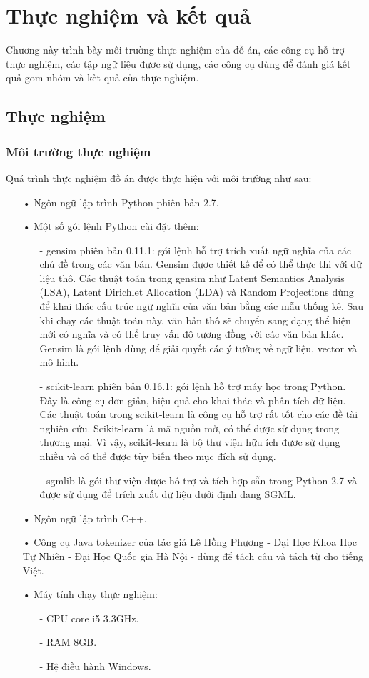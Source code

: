 \chapter{Thực nghiệm và kết quả}
\label{Chapter4}
Chương này trình bày môi trường thực nghiệm của đồ án, các công cụ hỗ trợ thực nghiệm, các tập ngữ liệu được sử dụng, các công cụ dùng để đánh giá kết quả gom nhóm và kết quả của thực nghiệm.

\section{Thực nghiệm}
\subsection{Môi trường thực nghiệm}
Quá trình thực nghiệm đồ án được thực hiện với môi trường như sau:
\begin{enumerate}
\item[•]Ngôn ngữ lập trình Python phiên bản 2.7.
\item[•]Một số gói lệnh Python cài đặt thêm:
\begin{enumerate}
\item[-] gensim phiên bản 0.11.1: gói lệnh hỗ trợ trích xuất ngữ nghĩa của các chủ đề trong các văn bản.
Gensim được thiết kế để có thể thực thi với dữ liệu thô.
Các thuật toán trong gensim như Latent Semantics Analysis (LSA), Latent Dirichlet Allocation (LDA) và Random Projections dùng để khai thác cấu trúc ngữ nghĩa của văn bản bằng các mẫu thống kê.
Sau khi chạy các thuật toán này, văn bản thô sẽ chuyển sang dạng thể hiện mới có nghĩa và có thể truy vấn độ tương đồng với các văn bản khác.
Gensim là gói lệnh dùng để giải quyết các ý tưởng về ngữ liệu, vector và mô hình.
\item[-] scikit-learn phiên bản 0.16.1: gói lệnh hỗ trợ máy học trong Python.
Đây là công cụ đơn giản, hiệu quả cho khai thác và phân tích dữ liệu.
Các thuật toán trong scikit-learn là công cụ hỗ trợ rất tốt cho các đề tài nghiên cứu.
Scikit-learn là mã nguồn mở, có thể được sử dụng trong thương mại.
Vì vậy, scikit-learn là bộ thư viện hữu ích được sử dụng nhiều và có thể được tùy biến theo mục đích sử dụng.
\item[-] sgmlib là gói thư viện được hỗ trợ và tích hợp sẵn trong Python 2.7 và được sử dụng để trích xuất dữ liệu dưới định dạng SGML.
\end{enumerate}
\item[•]Ngôn ngữ lập trình C++.
\item[•]Công cụ Java tokenizer của tác giả Lê Hồng Phương - Đại Học Khoa Học Tự Nhiên - Đại Học Quốc gia Hà Nội - dùng để tách câu và tách từ cho tiếng Việt.
\item[•]Máy tính chạy thực nghiệm:
\begin{enumerate}
\item[-]CPU core i5 3.3GHz.
\item[-]RAM 8GB.
\item[-]Hệ điều hành Windows.
\end{enumerate}
\end{enumerate}


